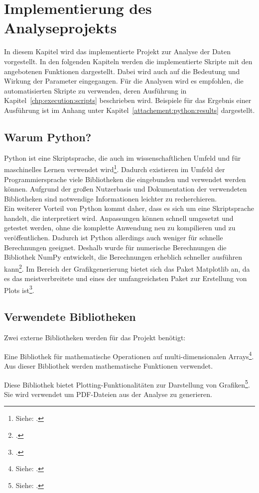 \chapter{Implementierung des Analyseprojekts}
\label{chp:python:implementation}
In diesem Kapitel wird das implementierte Projekt zur Analyse der Daten vorgestellt.
In den folgenden Kapiteln werden die implementierte Skripte mit den angebotenen Funktionen dargestellt. 
Dabei wird auch auf die Bedeutung und Wirkung der Parameter eingegangen.
Für die Analysen wird es empfohlen, die automatisierten Skripte zu verwenden, deren Ausführung in Kapitel~\ref{chp:execution:scripts} beschrieben wird.
Beispiele für das Ergebnis einer Ausführung ist im Anhang unter Kapitel~\ref{attachement:python:results} dargestellt.

\section{Warum Python?}
Python ist eine Skriptsprache, die auch im wissenschaftlichen Umfeld und für maschinelles Lernen verwendet wird\footnote{ Siehe: \cite{Fuxjaeger2017}.}.
Dadurch existieren im Umfeld der Programmiersprache viele Bibliotheken die eingebunden und verwendet werden können.
Aufgrund der großen Nutzerbasis und Dokumentation der verwendeten Bibliotheken sind notwendige Informationen leichter zu recherchieren.\\
Ein weiterer Vorteil von Python kommt daher, dass es sich um eine Skriptsprache handelt, die interpretiert wird.
Anpassungen können schnell umgesetzt und getestet werden, ohne die komplette Anwendung neu zu kompilieren und zu veröffentlichen.
Dadurch ist Python allerdings auch weniger für schnelle Berechnungen geeignet.
Deshalb wurde für numerische Berechnungen die Bibliothek NumPy entwickelt, die Berechnungen erheblich schneller ausführen kann\footnote{ \cite[vgl.][S.173f]{Woyand2017}.}.
Im Bereich der Grafikgenerierung bietet sich das Paket Matplotlib an, da es das meistverbreitete und eines der umfangreichsten Paket zur Erstellung von Plots ist\footnote{ \cite[vgl.][S.45]{Rossant2013}.}.

\section{Verwendete Bibliotheken}
Zwei externe Bibliotheken werden für das Projekt benötigt:
\begin{description}[style=nextline]
	\item[NumPy] Eine Bibliothek für mathematische Operationen auf multi-dimensionalen Arrays\footnote{ Siehe: \cite{Athanasias2014}.}. Aus dieser Bibliothek werden mathematische Funktionen verwendet.
	\item[Matplotlib] Diese Bibliothek bietet Plotting-Funktionalitäten zur Darstellung von Grafiken\footnote{ Siehe: \cite{Matplotlib2019}.}. Sie wird verwendet um PDF-Dateien aus der Analyse zu generieren.
\end{description}
